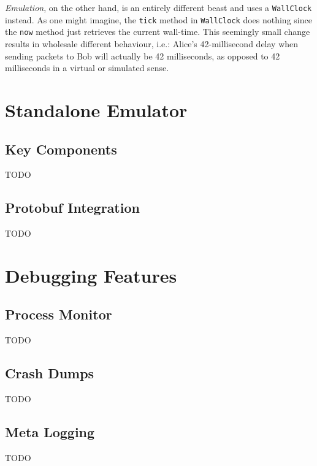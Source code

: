 \emph{Emulation}, on the other hand, is an entirely different beast and uses a \texttt{WallClock} instead. As one
might imagine, the \texttt{tick} method in \texttt{WallClock} does nothing since the \texttt{now} method just
retrieves the current wall-time. This seemingly small change results in wholesale different behaviour, i.e.: Alice's
42-millisecond delay when sending packets to Bob will actually be 42 milliseconds, as opposed to 42 milliseconds in a
virtual or simulated sense.


\section{Standalone Emulator}

\subsection{Key Components}

TODO

\subsection{Protobuf Integration}

TODO


\section{Debugging Features}

\subsection{Process Monitor}

TODO

\subsection{Crash Dumps}

TODO

\subsection{Meta Logging}

TODO
